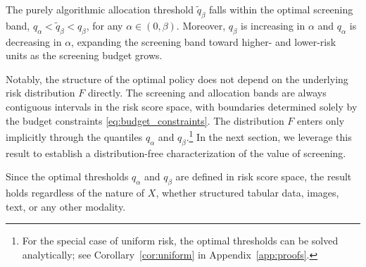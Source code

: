 \begin{corollary}
\label{cor:at_the_margin}
The purely algorithmic allocation threshold $\widetilde{q}_\beta$ falls within the optimal screening band, $q_\alpha < \widetilde{q}_\beta < q_\beta$, for any $\alpha \in (0,\beta)$. Moreover, $q_\beta$ is increasing in $\alpha$ and $q_\alpha$ is decreasing in $\alpha$, expanding the screening band toward higher- and lower-risk units as the screening budget grows.
\end{corollary}

Notably, the structure of the optimal policy does not depend on the underlying risk distribution $F$ directly. The screening and allocation bands are always contiguous intervals in the risk score space, with boundaries determined solely by the budget constraints \eqref{eq:budget_constraints}. The distribution $F$ enters only implicitly through the quantiles $q_\alpha$ and $q_\beta$.\footnote{For the special case of uniform risk, the optimal thresholds can be solved analytically; see Corollary~\ref{cor:uniform} in Appendix~\ref{app:proofs}.} In the next section, we leverage this result to establish a distribution-free characterization of the value of screening. 


\begin{remark}
Since the optimal thresholds $q_\alpha$ and $q_\beta$ are defined in risk score space, the result holds regardless of the nature of $X$, whether structured tabular data, images, text, or any other modality.
\end{remark}




